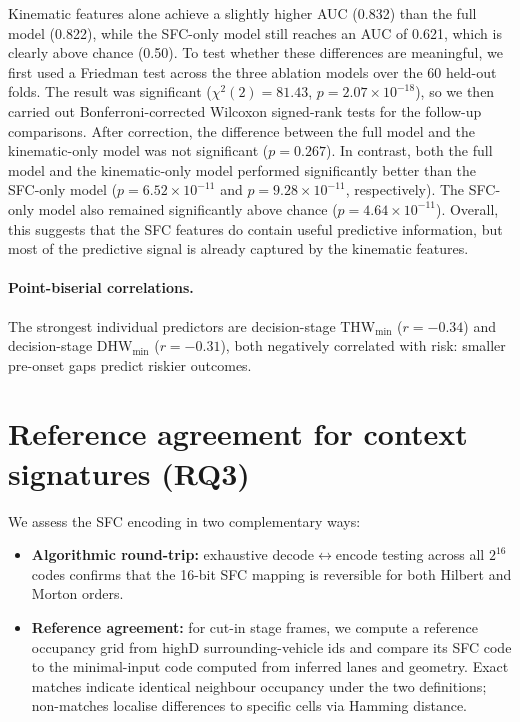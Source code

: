 \documentclass[12pt,a4paper,twoside,openright]{report}
\begin{document}
    Kinematic features alone achieve a slightly higher AUC (0.832) than the full model (0.822), while the SFC-only model still reaches an AUC of 0.621, which is clearly above chance (0.50). To test whether these differences are meaningful, we first used a Friedman test across the three ablation models over the 60 held-out folds. The result was significant ($\chi^2(2)=81.43$, $p = 2.07 \times 10^{-18}$), so we then carried out Bonferroni-corrected Wilcoxon signed-rank tests for the follow-up comparisons. After correction, the difference between the full model and the kinematic-only model was not significant ($p = 0.267$). In contrast, both the full model and the kinematic-only model performed significantly better than the SFC-only model ($p = 6.52 \times 10^{-11}$ and $p = 9.28 \times 10^{-11}$, respectively). The SFC-only model also remained significantly above chance ($p = 4.64 \times 10^{-11}$). Overall, this suggests that the SFC features do contain useful predictive information, but most of the predictive signal is already captured by the kinematic features.

    \paragraph{Point-biserial correlations.}
    The strongest individual predictors are decision-stage THW$_{\min}$ ($r=-0.34$) and decision-stage DHW$_{\min}$ ($r=-0.31$), both negatively correlated with risk: smaller pre-onset gaps predict riskier outcomes.

    \section{Reference agreement for context signatures (RQ3)}
    We assess the SFC encoding in two complementary ways:
    \begin{itemize}[leftmargin=1.2em]
  \item \textbf{Algorithmic round-trip:} exhaustive decode$\leftrightarrow$encode testing across all $2^{16}$ codes confirms that the 16-bit SFC mapping is reversible for both Hilbert and Morton orders.
  \item \textbf{Reference agreement:} for cut-in stage frames, we compute a reference occupancy grid from highD surrounding-vehicle ids and compare its SFC code to the minimal-input code computed from inferred lanes and geometry. Exact matches indicate identical neighbour occupancy under the two definitions; non-matches localise differences to specific cells via Hamming distance.
    \end{itemize}
\end{document}
